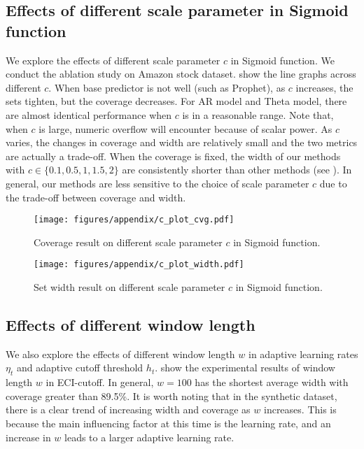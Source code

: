 \subsection{Effects of different scale parameter in Sigmoid function}
\label{Effect of different scale parameter in Sigmoid function}
We explore the effects of different scale parameter $c$ in Sigmoid function. We conduct the ablation study on Amazon stock dataset.  show the line graphs across different $c$. When base predictor is not well (such as Prophet), as $c$ increases, the sets tighten, but the coverage decreases. For AR model and Theta model, there are almost identical performance when $c$ is in a reasonable range. Note that, when $c$ is large, numeric overflow will encounter because of scalar power. As $c$ varies, the changes in coverage and width are relatively small and the two metrics are actually a trade-off. When the coverage is fixed, the width of our methods with $c \in \{0.1, 0.5, 1, 1.5, 2\}$ are consistently shorter than other methods (see ). In general, our methods are less sensitive to the choice of scale parameter $c$ due to the trade-off between coverage and width. 

\begin{figure*}[h]
  \centering
  \texttt{[image: figures/appendix/c\_plot\_cvg.pdf]}
  \caption{Coverage result on different scale parameter $c$ in Sigmoid function.}
  \label{c_plot_cvg}
\end{figure*}
\begin{figure*}[h]
  \centering
  \texttt{[image: figures/appendix/c\_plot\_width.pdf]}
  \caption{Set width result on different scale parameter $c$ in Sigmoid function.}
  \label{c_plot_width}
\end{figure*}


\subsection{Effects of different window length}
\label{Effect of different window length}
We also explore the effects of different window length $w$ in adaptive learning rates $\eta_t$ and adaptive cutoff threshold $h_t$.  show the experimental results of window length $w$ in ECI-cutoff. In general, $w=100$ has the shortest average width with coverage greater than 89.5\%. It is worth noting that in the synthetic dataset, there is a clear trend of increasing width and coverage as $w$ increases. This is because the main influencing factor at this time is the learning rate, and an increase in $w$ leads to a larger adaptive learning rate.


